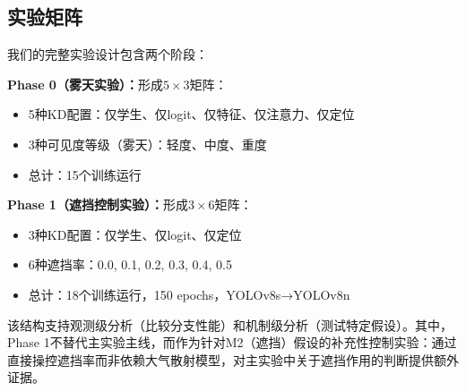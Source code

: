 \subsection{实验矩阵}

我们的完整实验设计包含两个阶段：

\textbf{Phase 0（雾天实验）：}形成$5 \times 3$矩阵：
\begin{itemize}
    \item 5种KD配置：仅学生、仅logit、仅特征、仅注意力、仅定位
    \item 3种可见度等级（雾天）：轻度、中度、重度
    \item 总计：15个训练运行
\end{itemize}

\textbf{Phase 1（遮挡控制实验）：}形成$3 \times 6$矩阵：
\begin{itemize}
    \item 3种KD配置：仅学生、仅logit、仅定位
    \item 6种遮挡率：0.0, 0.1, 0.2, 0.3, 0.4, 0.5
    \item 总计：18个训练运行，150 epochs，YOLOv8s→YOLOv8n
\end{itemize}

该结构支持观测级分析（比较分支性能）和机制级分析（测试特定假设）。其中，Phase 1不替代主实验主线，而作为针对M2（遮挡）假设的补充性控制实验：通过直接操控遮挡率而非依赖大气散射模型，对主实验中关于遮挡作用的判断提供额外证据。
